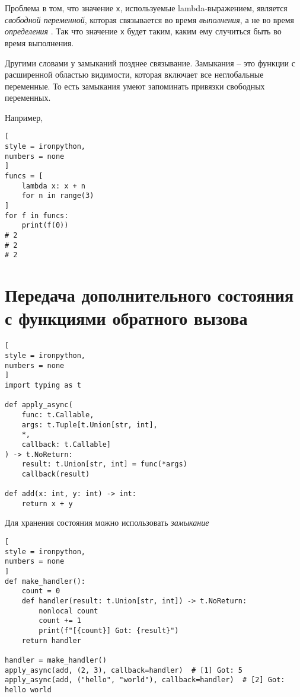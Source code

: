 \documentclass[%
	11pt,
	a4paper,
	utf8,
		]{article}
\begin{document}
Проблема в том, что значение \texttt{x}, используемые lambda-выражением, является \emph{свободной переменной}, которая связывается во время \emph{выполнения}, а не во время \emph{определения} \cite[]{beazley:python_cookbook-2019}. Так что значение \texttt{x} будет таким, каким ему случиться быть во время выполнения.


Другими словами у замыканий позднее связывание. Замыкания -- это функции с расширенной областью видимости, которая включает все неглобальные переменные. То есть замыкания умеют запоминать привязки свободных переменных.

Например,
\begin{lstlisting}[
style = ironpython,
numbers = none	
]
funcs = [
    lambda x: x + n
    for n in range(3)
]
for f in funcs:
    print(f(0))
# 2
# 2
# 2
\end{lstlisting}

\section{Передача дополнительного состояния с функциями обратного вызова}

\begin{lstlisting}[
style = ironpython,
numbers = none	
]
import typing as t

def apply_async(
    func: t.Callable,
    args: t.Tuple[t.Union[str, int],
    *,
    callback: t.Callable]
) -> t.NoReturn:
    result: t.Union[str, int] = func(*args)
    callback(result)
    
def add(x: int, y: int) -> int:
    return x + y
\end{lstlisting}

Для хранения состояния можно использовать \emph{замыкание} \cite[]{beazley:python_cookbook-2019}
\begin{lstlisting}[
style = ironpython,
numbers = none
]
def make_handler():
    count = 0
    def handler(result: t.Union[str, int]) -> t.NoReturn:
        nonlocal count
        count += 1
        print(f"[{count}] Got: {result}")
    return handler
    
handler = make_handler()
apply_async(add, (2, 3), callback=handler)  # [1] Got: 5
apply_async(add, ("hello", "world"), callback=handler)  # [2] Got: hello world 
\end{lstlisting}
\end{document}
